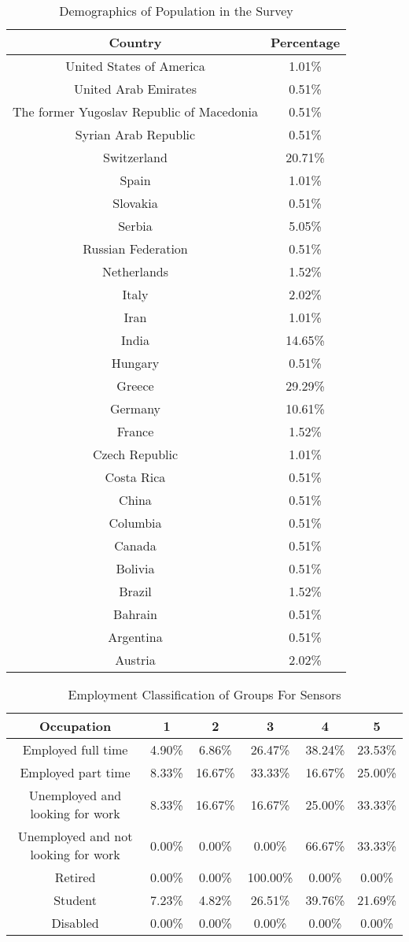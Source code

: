
\begin{table}[h!]
  \centering
  \caption{Demographics of Population in the Survey}
  \label{tab:demo}
  \begin{tabular}{cc}
    \toprule
     Country&Percentage\\
    \midrule
United States of America&1.01\%\\
United Arab Emirates&0.51\%\\
The former Yugoslav Republic of Macedonia&0.51\%\\
Syrian Arab Republic	&0.51\%\\
Switzerland&20.71\%\\
Spain	&1.01\%\\
Slovakia	&0.51\%\\
Serbia&	5.05\%\\
Russian Federation&	0.51\%\\
Netherlands	&1.52\%\\
Italy	&2.02\%\\
Iran&1.01\%\\
India	&14.65\%\\
Hungary	&0.51\%\\
Greece	&29.29\%\\
Germany	&10.61\%\\
France	&1.52\%\\
Czech Republic	&1.01\%\\
Costa Rica	&0.51\%\\
China	&0.51\%\\
Columbia	&0.51\%\\
Canada	&0.51\%\\
Bolivia	&0.51\%\\
Brazil	&1.52\%\\
Bahrain	&0.51\%\\
Argentina	&0.51\%\\
Austria & 2.02\%\\
    \bottomrule
  \end{tabular}
\end{table}

\begin{table}[h!]
  \centering
  \caption{Employment Classification of Groups For Sensors}
  \label{tab:emp_sensors}
  \begin{tabular}{cccccc}
    \toprule
     Occupation&1&2&3&4&5\\
    \midrule
Employed full time&4.90\%&6.86\%&26.47\%&38.24\%&23.53\%\\
Employed part time&8.33\%&16.67\%&33.33\%&16.67\%&25.00\%\\
Unemployed and looking for work&8.33\%&16.67\%&16.67\%&25.00\%&33.33\%\\
Unemployed and not looking for work&0.00\%&0.00\%&0.00\%&66.67\%&33.33\%\\
Retired&0.00\%&0.00\%&100.00\%&0.00\%&0.00\%\\
Student&7.23\%&4.82\%&26.51\%&39.76\%&21.69\%\\
Disabled&0.00\%&0.00\%&0.00\%&0.00\%&0.00\%\\
    \bottomrule
  \end{tabular}
\end{table}



